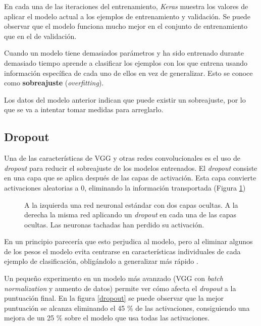 En cada una de las iteraciones del entrenamiento, \textit{Keras} muestra los
valores de aplicar el modelo actual a los ejemplos de entrenamiento y
validación. Se puede observar que el modelo funciona mucho mejor en el conjunto
de entrenamiento que en el de validación.

Cuando un modelo tiene demasiados parámetros y ha sido entrenado durante demasiado tiempo aprende a clasificar los ejemplos con los que entrena usando información específica de cada uno de ellos en vez de generalizar. Esto se conoce como \textbf{sobreajuste} (\textit{overfitting}).

Los datos del modelo anterior indican que puede existir un sobreajuste, por lo que se va a intentar tomar medidas para arreglarlo.

\subsection{Dropout}

Una de las características de VGG y otras redes convolucionales es el uso de \textit{dropout} para reducir el sobreajuste de los modelos entrenados. El \textit{dropout} consiste en una capa que se aplica después de las capas de activación. Esta capa convierte activaciones aleatorias a 0, eliminando la información transportada (Figura \ref{dropout-net})

\begin{figure}
    \caption{A la izquierda una red neuronal estándar con dos capas ocultas. A la derecha la misma red aplicando un \textit{dropout} en cada una de las capas ocultas. Las neuronas tachadas han perdido su activación.}
\label{dropout-net}
\end{figure}



En un principio parecería que esto perjudica al modelo, pero al eliminar algunos de los pesos el modelo evita centrarse en características individuales de cada ejemplo de clasificación, obligándolo a generalizar más rápido \parencite{dropout}.

Un pequeño experimento en un modelo más avanzado (VGG con \textit{batch normalization} y aumento de datos) permite ver cómo afecta el \textit{dropout} a la puntuación final. En la figura \ref{dropout} se puede observar que la mejor puntuación se alcanza eliminando el 45 \% de las activaciones, consiguiendo una mejora de un 25 \% sobre el modelo que usa todas las activaciones.

